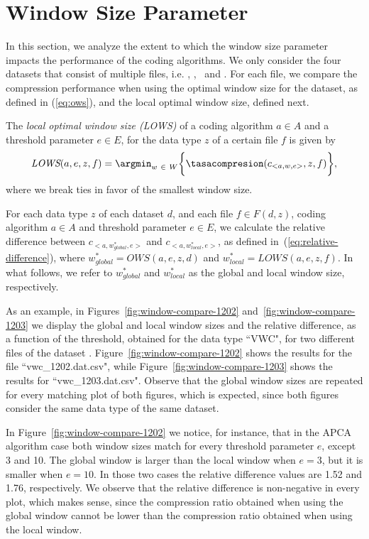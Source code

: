 
\clearpage
\section{Window Size Parameter}
\label{secX:windows}

In this section, we analyze the extent to which the window size parameter impacts the performance of the coding algorithms. We only consider the four datasets that consist of multiple files, i.e. \datasetirkis, \datasetsst, \datasetadcp \ and \datasetsolar. For each file, we compare the compression performance when using the optimal window size for the dataset, as defined in (\ref{eq:ows}), and the local optimal window size, defined next.


\newcommand{\lows}{\textit{LOWS}}
\begin{defcion}
The \textit{local optimal window size (\lows)} of a coding algorithm $a \in A$ and a threshold parameter $e \in E$, for the data type $z$ of a certain file $f$ is given by
\begin{equation}
\lows(a, e, z, f) = \argmin_{w\ \in \ W} \biggl\{ \tasacompresion(c_{<a, w, e>}, z, f) \biggr\},
\end{equation}
where we break ties in favor of the smallest window size.
\end{defcion}


For each data type $z$ of each dataset $d$, and each file $f \in F(d, z)$, coding algorithm $a \in A$ and threshold parameter $e \in E$, we calculate the relative difference between $c_{<a, w_{global}^{*}, e>}$ and $c_{<a, w_{local}^{*}, e>}$, as defined in~(\ref{eq:relative-difference}), where $w_{global}^{*}=OWS(a, e, z, d)$ and $w_{local}^{*}=LOWS(a, e, z, f)$. In what follows, we refer to $w_{global}^{*}$ and $w_{local}^{*}$ as the global and local window size, respectively.


As an example, in Figures~\ref{fig:window-compare-1202} and~\ref{fig:window-compare-1203} we display the global and local window sizes and the relative difference, as a function of the threshold, obtained for the data type ``VWC", for two different files of the dataset \datasetirkis. Figure~\ref{fig:window-compare-1202} shows the results for the file ``vwc\_1202.dat.csv", while Figure~\ref{fig:window-compare-1203} shows the results for ``vwc\_1203.dat.csv". Observe that the global window sizes are repeated for every matching plot of both figures, which is expected, since both figures consider the same data type of the same dataset.


In Figure~\ref{fig:window-compare-1202} we notice, for instance, that in the APCA algorithm case both window sizes match for every threshold parameter $e$, except 3 and 10. The global window is larger than the local window when $e=3$, but it is smaller when $e=10$. In those two cases the relative difference values are 1.52 and 1.76, respectively. We observe that the relative difference is non-negative in every plot, which makes sense, since the compression ratio obtained when using the global window cannot be lower than the compression ratio obtained when using the local window.



